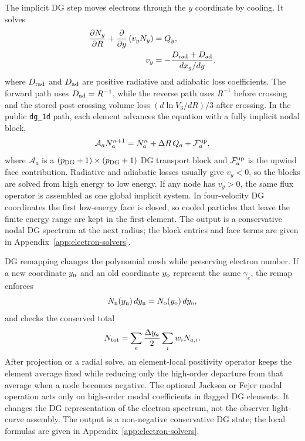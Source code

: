 \documentclass[twocolumn]{aastex702}
\begin{document}
The implicit DG step moves electrons through the \(y\) coordinate by cooling.
It solves
\begin{equation}
\begin{aligned}
\frac{\partial N_y}{\partial R}
+\frac{\partial}{\partial y}\left(v_yN_y\right)&=Q_y,\\
v_y&=-\frac{D_{\rm rad}+D_{\rm ad}}
{dx_g/dy}.
\end{aligned}
\end{equation}
where \(D_{\rm rad}\) and \(D_{\rm ad}\) are positive radiative and adiabatic
loss coefficients.  The forward path uses \(D_{\rm ad}=R^{-1}\), while the
reverse path uses \(R^{-1}\) before crossing and the stored post-crossing volume
loss \((d\ln V_3/dR)/3\) after crossing.  In the public \texttt{dg\_1d} path,
each element advances the equation with a fully implicit nodal block,
\begin{equation}
\mathcal A_a N_a^{n+1}
=N_a^n+\Delta R\,Q_a+\mathcal F_a^{\rm up},
\end{equation}
where \(\mathcal A_a\) is a \((p_{\rm DG}+1)\times(p_{\rm DG}+1)\) DG transport
block and \(\mathcal F_a^{\rm up}\) is the upwind face contribution.  Radiative
and adiabatic losses usually give \(v_y<0\), so the blocks are solved from high
energy to low energy.  If any node has \(v_y>0\), the same flux operator is
assembled as one global implicit system.  In four-velocity DG coordinates the
first low-energy face is closed, so cooled particles that leave the finite
energy range are kept in the first element.  The output is a conservative nodal
DG spectrum at the next radius; the block entries and face terms are given in
Appendix~\ref{app:electron-solvers}.

DG remapping changes the polynomial mesh while preserving electron number.  If a
new coordinate \(y_{\rm n}\) and an old coordinate \(y_{\rm o}\) represent the
same \(\gamma_e\), the remap enforces
\begin{equation}
N_{\rm n}(y_{\rm n})\,dy_{\rm n}
=N_{\rm o}(y_{\rm o})\,dy_{\rm o},
\end{equation}
and checks the conserved total
\begin{equation}
N_{\rm tot}=\sum_a\frac{\Delta y_a}{2}
\sum_i w_iN_{a,i}.
\end{equation}
After projection or a radial solve, an element-local positivity operator keeps
the element average fixed while reducing only the high-order departure from that
average when a node becomes negative.  The optional Jackson or Fejer modal
operation acts only on high-order modal coefficients in flagged DG elements.  It
changes the DG representation of the electron spectrum, not the observer
light-curve assembly.  The output is a non-negative conservative DG state; the
local formulas are given in Appendix~\ref{app:electron-solvers}.
\end{document}
